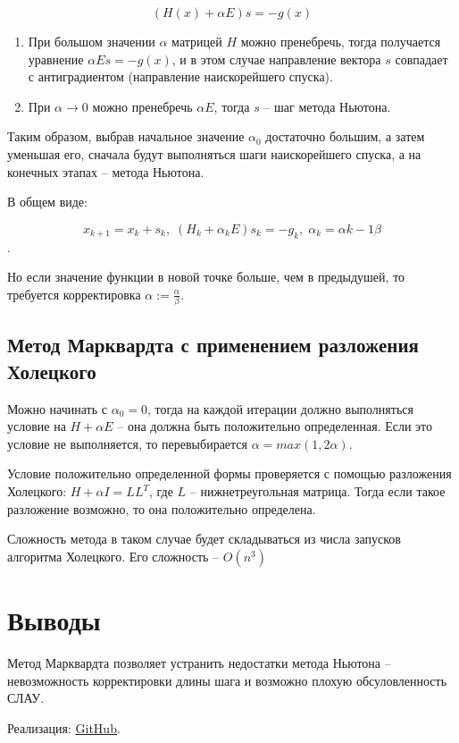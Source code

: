 \documentclass[12pt]{article}
\begin{document}
\[ \left( H(x) + \alpha E \right) s = -g(x) \]

\begin{enumerate}
	\item При большом значении $\alpha$ матрицей $H$ можно пренебречь, тогда получается уравнение $\alpha Es = -g(x)$, и в этом случае направление вектора $s$ совпадает с антиградиентом (направление наискорейшего спуска).
	\item При $\alpha \rightarrow 0$ можно пренебречь $\alpha E$, тогда $s$ -- шаг метода Ньютона.
\end{enumerate} 

Таким образом, выбрав начальное значение $\alpha_0$ достаточно большим, а затем уменьшая его, сначала будут выполняться шаги наискорейшего спуска, а на конечных этапах -- метода Ньютона. 

В общем виде:

\[ x_{k+1} = x_k + s_k, \; \left( H_k + \alpha_k E \right) s_k = -g_k, \; \alpha_k = \alpha{k-1} \beta \].

Но если значение функции в новой точке больше, чем в предыдушей, то требуется корректировка $\alpha := \frac{\alpha}{\beta}$.

\subsection{Метод Марквардта с применением разложения Холецкого}

Можно начинать с $\alpha_0 = 0$, тогда на каждой итерации должно выполняться условие на $ H+\alpha E$ -- она должна быть положительно определенная. Если это условие не выполняется, то перевыбирается $\alpha = max \left( 1, 2\alpha \right)$.

Условие положительно определенной формы проверяется с помощью разложения Холецкого: $H+\alpha I = LL^T$, где $L$ -- нижнетреугольная матрица. Тогда если такое разложение возможно, то она положительно определена.

Сложность метода в таком случае будет складываться из числа запусков алгоритма Холецкого. Его сложность -- $O(n^3)$

\newpage
\section{Выводы}

Метод Марквардта позволяет устранить недостатки метода Ньютона -- невозможность корректировки длины шага и возможно плохую обсуловленность СЛАУ.




Реализация: \href{https://github.com/Mr3zee/Linear-Equations}{GitHub}.
\end{document}
